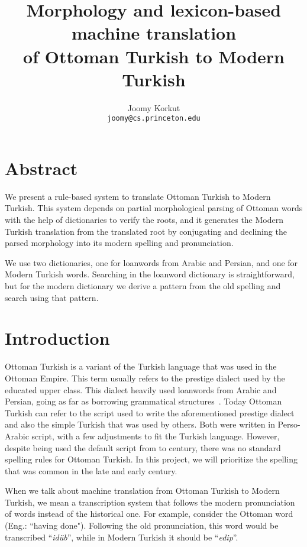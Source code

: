 \documentclass[10pt,twocolumn]{article}
\title{Morphology and lexicon-based machine translation\\of Ottoman Turkish to Modern Turkish}
\author{
  Joomy Korkut\\
  \texttt{joomy@cs.princeton.edu}
}
\date{}
\theoremstyle{nonumberplain}
\newcommand{\otto}[1]{\RLE{\ottoman{}\Large{}#1}}
\newcommand{\word}[1]{``\emph{#1}''}
\begin{document}
\setlength{\abovedisplayskip}{-17pt}
\setlength{\belowdisplayskip}{0pt}
\setlength{\abovedisplayshortskip}{0pt}
\setlength{\belowdisplayshortskip}{0pt}

\maketitle

\section*{Abstract}
We present a rule-based system to translate Ottoman Turkish to Modern Turkish.
This system depends on partial morphological parsing of Ottoman words with the help of
dictionaries to verify the roots, and it generates the Modern Turkish
translation from the translated root by conjugating and declining the parsed
morphology into its modern spelling and pronunciation.

We use two dictionaries, one for loanwords from Arabic and
Persian, and one for Modern Turkish words. Searching in the loanword dictionary
is straightforward, but for the modern dictionary we derive a pattern from the
old spelling and search using that pattern.

\section{Introduction}

Ottoman Turkish is a variant of the Turkish language that was used in the
Ottoman Empire. This term usually refers to the prestige dialect used by the
educated upper class. This dialect heavily used loanwords from Arabic and
Persian, going as far as borrowing grammatical
structures~\cite{redhouse1884simplified, hagopian1907ottoman, strauss2011linguistic}.
Today Ottoman Turkish can refer to the script used to write the
aforementioned prestige dialect and also the simple Turkish that was used by
others. Both were written in Perso-Arabic script, with a few adjustments to fit
the Turkish language.
However, despite being used the default script from  to 
century, there was no standard spelling rules for Ottoman Turkish.  In this
project, we will prioritize the spelling that was common
in the late  and early  century.

When we talk about machine translation from Ottoman Turkish to Modern Turkish,
we mean a transcription system that follows the modern pronunciation of words
instead of the historical one.
For example, consider the Ottoman word \otto{ايدوب} (Eng.: ``having done").
Following the old pronunciation, this word would be transcribed \word{idüb}, while
in Modern Turkish it should be \word{edip}.
\end{document}
